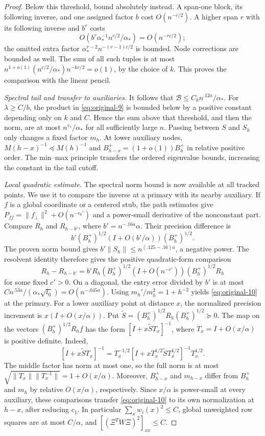 \begin{proof}
Below this threshold, bound absolutely instead. A span-one block,
its following inverse, and one assigned factor $b$ cost
$O(n^{-c/2})$. A higher span $r$ with its following inverse and
$b^r$ costs
\[
 O(b^r\alpha_*^{-1}n^{c/2}/\alpha_*)=O(n^{-rc/2});
\]
the omitted extra factor $\alpha_*^{r-2}n^{-(r-1)c/2}$ is bounded.
Node corrections are bounded as well. The sum of all such tuples is
at most
$n^{1+o(1)}(n^{c/2}/\alpha_*)n^{-kc/2}=o(1)$, by the choice of $k$.
This proves the comparison with the linear pencil.

\emph{Spectral tail and transfer to auxiliaries.}
It follows that $\mathcal B\le C_kn^{.12a}/\alpha_*$. For
$\lambda\ge C/b$, the product in \eqref{eq:original-9} is bounded
below by a positive constant depending only on $k$ and $C$. Hence
the sum above that threshold, and then the norm, are at most
$n^{v_*}/\alpha_*$ for all sufficiently large $n$. Passing between
$S$ and $S_h$ only changes a fixed factor $m_h$. At lower auxiliary
nodes, $M(h-x)^{-1}\preceq M(h)^{-1}$ and
$B_{h-x}^+=(1+o(1))B_h^+$ in relative positive order. The min--max
principle transfers the ordered eigenvalue bounds, increasing the
constant in the tail cutoff.

\emph{Local quadratic estimate.}
The spectral norm bound is now available at all tracked points. We use
it to compare the inverse at a primary with its nearby auxiliary.
If $f$ is a global
coordinate or a centered stub, the path estimates give
$P_{ff}=\|f_\perp\|^2+O(n^{-c_0'})$ and a power-small derivative of
the nonconstant part. Compare $R_h$ and $R_{h-b'}$, where
$b'=n^{-.16a}\alpha$. Their precision difference is
\[
 b'(B_h^+)^{1/2}(I+O(b'/\alpha))(B_h^+)^{1/2}.
\]
The proven norm bound gives
$b'\|S_h\|\le n^{(.125-.16)a}$, a negative power. The resolvent
identity therefore gives the positive quadratic-form comparison
\[
 R_h-R_{h-b'}
 =b'R_h(B_h^+)^{1/2}(I+O(n^{-c'}))(B_h^+)^{1/2}R_h
\]
for some fixed $c'>0$. On a diagonal, the entry error divided by
$b'$ is at most
$Cn^{.53a}/(\alpha_*\sqrt{l_0})=O(n^{-.045a})$.
Using $m_h'/m_h^2=1+h^{-2}$ yields \eqref{eq:original-10} at the
primary.
For a lower auxiliary point at distance $x$, the normalized
precision increment is $x(I+O(x/\alpha))$. Put
$\widetilde S=(B_h^+)^{1/2}R_h(B_h^+)^{1/2}\succeq0$. The map on
the vectors $(B_h^+)^{1/2}R_hf$ has the form
$[I+x\widetilde S T_x]^{-1}$, where
$T_x=I+O(x/\alpha)$ is positive definite. Indeed,
\[
 [I+x\widetilde S T_x]^{-1}
 =T_x^{-1/2}
   [I+xT_x^{1/2}\widetilde S T_x^{1/2}]^{-1}T_x^{1/2}.
\]
The middle factor has norm at most one, so the full norm is at most
$\sqrt{\|T_x\|\|T_x^{-1}\|}=1+O(x/\alpha)$.
Moreover, $B_{h-x}^+$ and $m_{h-x}$ differ from
$B_h^+$ and $m_h$ by relative $O(x/\alpha)$, respectively. Since
$x/\alpha$ is power-small at every auxiliary, these comparisons
transfer \eqref{eq:original-10} to its own normalization at $h-x$,
after reducing $c_1$.
In particular $\sum_xw_i(x)^2\le C$, global unweighted row squares
are at most $C/\alpha$, and $[(\Xi^TW\Xi)^2]_{xx}\le C$.


\end{proof}
